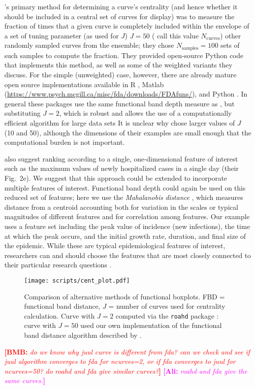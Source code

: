 \documentclass[12pt]{article}
\newcommand{\comment}{\showcomment}
\newcommand{\showcomment}[3]{\textcolor{#1}{\textbf{[#2: }\textsl{#3}\textbf{]}}}
\newcommand{\ncurve}{\ensuremath{N_{\textrm{curves}}}\xspace}
\newcommand{\nsample}{\ensuremath{N_{\textrm{samples}}}\xspace}
\newcommand{\ali}[1]{\comment{magenta}{Ali}{#1}}
\newcommand{\bmb}[1]{\comment{red}{BMB}{#1}}
\theoremstyle{definition} %
\begin{document}
\cite{juul2021fixed}'s primary method for determining a curve's centrality (and hence whether it should be included in a central set of curves for display) was to measure the fraction of times that a given curve is completely included within the envelope of a set of tuning parameter (as \cite{lopez2009concept} used for $J$) $J=50$ (\cite{juul2021fixed} call this value \ncurve) other randomly sampled curves from the ensemble; they chose $\nsample=100$ sets of such samples to compute the fraction. They provided open-source Python code that implements this method, as well as some of the weighted variants they discuss. For the simple (unweighted) case, however, there are already mature open source implementations available in R \citep{fda_pkg,roahd}, Matlab (\url{https://www.psych.mcgill.ca/misc/fda/downloads/FDAfuns/}), and Python \citep{seabold2010statsmodels}. In general these packages use the same functional band depth measure as \cite{juul2021fixed}, but substituting $J=2$, which is robust \citep{lopez2009concept} and allows the use of a computationally efficient algorithm for large data sets \citep{sun2012exact}
It is unclear why \cite{juul2021fixed} chose larger values of $J$ (10 and 50), although the dimensions of their examples are small enough that the computational burden is not important.

\cite{juul2021fixed} also suggest ranking according to a single, one-dimensional feature of interest such as the maximum values of newly hospitalized cases in a single day (their Fig.~2e). We suggest that this approach could be extended to incorporate multiple features of interest. Functional band depth could again be used on this reduced set of features; here we use the \emph{Mahalanobis distance} \citep{mahalanobis1936generalized}, which measures distance from a centroid accounting both for variation in the scales or typical magnitudes of different features and for correlation among features.
Our example uses a feature set including the peak value of incidence (new infections), the time at which the peak occurs, and the initial growth rate, duration, and final size of the epidemic. While these are typical epidemiological features of interest, researchers can and should choose the features that are most closely connected to their particular research questions \citep{probert2016decision}.

\begin{figure}[h!]
  \centering
  \texttt{[image: scripts/cent\_plot.pdf]}
  \caption{Comparison of alternative methods of functional boxplots. FBD = functional band distance, $J$ = number of curves used for centrality calculation. Curve with $J=2$ computed via the \texttt{roahd} package \citep{roahd}: curve with $J=50$ used our own implementation of the functional band distance algorithm described by \cite{juul2021fixed}.
  }
  \label{p.a}
\end{figure}

\bmb{do we know why juul curve is different from fda? can we check and see if juul algorithm converges to fda for ncurves=2, or if fda converges to juul for ncurves=50? do roahd and fda give similar curves?}
\ali{roahd and fda give the same curves.}
  

\end{document}
